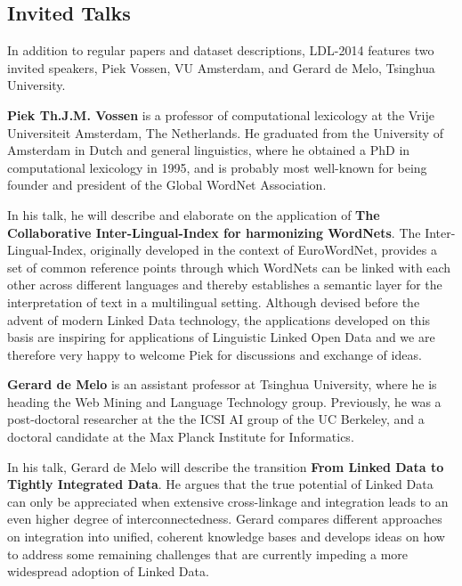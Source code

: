 \subsection{Invited Talks}

In addition to regular papers and dataset descriptions, LDL-2014 features two invited speakers, Piek Vossen, VU Amsterdam, and Gerard de Melo, Tsinghua University.

\smallskip

\textbf{Piek Th.J.M. Vossen} is a professor of computational lexicology at the Vrije Universiteit Amsterdam, The Netherlands. He graduated from the University of Amsterdam in Dutch and general linguistics, where he obtained a PhD in computational lexicology in 1995, and is probably most well-known for being founder and president of the Global WordNet Association.

In his talk, he will describe and elaborate on the application of \textbf{The Collaborative Inter-Lingual-Index for harmonizing WordNets}. 
The Inter-Lingual-Index, originally developed in the context of EuroWordNet, provides a set of common reference points through which WordNets can be linked with each other across different languages and thereby establishes a semantic layer for the interpretation of text in a multilingual setting. Although devised before the advent of modern Linked Data technology, the applications developed on this basis are inspiring for applications of Linguistic Linked Open Data and we are therefore very happy to welcome Piek for discussions and exchange of ideas.


\smallskip

\textbf{Gerard de Melo} is an assistant professor at Tsinghua
 University, where he is heading the Web Mining and Language Technology
 group. Previously, he was a post-doctoral researcher at the the ICSI AI group of the UC Berkeley, and a doctoral candidate at the Max Planck
 Institute for Informatics.

In his talk, Gerard de Melo will describe the transition \textbf{From Linked Data to Tightly Integrated Data}. 
He argues that the true potential of Linked Data can only be appreciated when extensive cross-linkage and integration leads to an even higher degree of interconnectedness. Gerard compares different approaches on integration into unified, coherent knowledge bases and develops ideas on how to address some remaining challenges that are currently
 impeding a more widespread adoption of Linked Data. 

